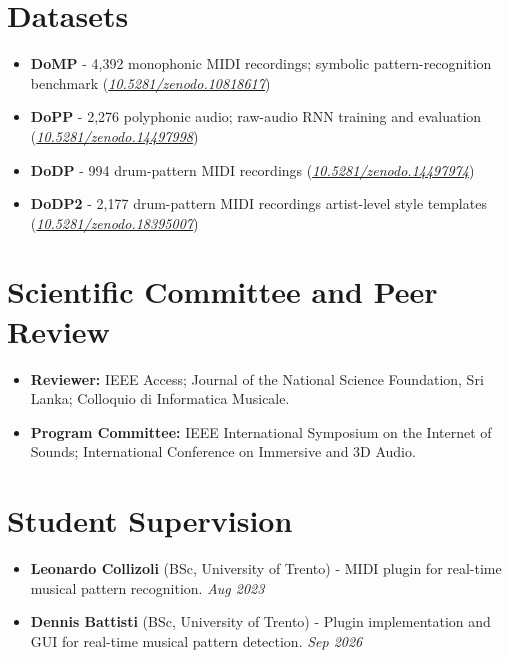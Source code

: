 \documentclass[11pt]{article}
\begin{document}
\section*{Datasets }
\begin{itemize}[leftmargin=1.2em, itemsep=-0.25em]
    \item \textbf{DoMP} - 4,392 monophonic MIDI recordings; symbolic pattern-recognition benchmark (\href{https://doi.org/10.5281/zenodo.10818617}{\textit{10.5281/zenodo.10818617}})
    \item \textbf{DoPP} - 2,276 polyphonic audio; raw-audio RNN training and evaluation (\href{https://doi.org/10.5281/zenodo.14497998}{\textit{10.5281/zenodo.14497998}})
    \item \textbf{DoDP} - 994 drum-pattern MIDI recordings (\href{https://doi.org/10.5281/zenodo.14497974}{\textit{10.5281/zenodo.14497974}})
    \item \textbf{DoDP2} - 2,177 drum-pattern MIDI recordings artist-level style templates (\href{https://doi.org/10.5281/zenodo.18395007}{\textit{10.5281/zenodo.18395007}})
\end{itemize}

\section*{Scientific Committee and Peer Review}
\begin{itemize}[leftmargin=1.2em, itemsep=-0.25em]
    \item \textbf{Reviewer:} IEEE Access; Journal of the National Science Foundation, Sri Lanka; Colloquio di Informatica Musicale.
    \item \textbf{Program Committee:} IEEE International Symposium on the Internet of Sounds; International Conference on Immersive and 3D Audio.
\end{itemize}

\section*{Student Supervision}
\begin{itemize}[leftmargin=1.2em, itemsep=-0.25em]
    \item \textbf{Leonardo Collizoli} (BSc, University of Trento) - MIDI plugin for real-time musical pattern recognition. \hfill \textit{Aug 2023}
    \item \textbf{Dennis Battisti} (BSc, University of Trento) - Plugin implementation and GUI for real-time musical pattern detection. \hfill \textit{Sep 2026}
\end{itemize}
\end{document}
